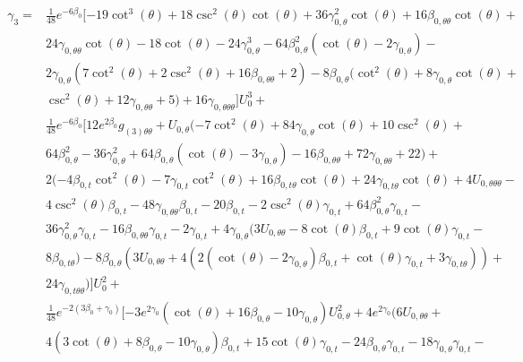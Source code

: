 \documentclass[a4paper,11pt]{article}
\numberwithin{equation}{section}
\begin{document}
\begin{align}
\begin{split} \label{eq: gamma_3_EM_tensor}
\gamma_{3}=&\frac{1}{48} e^{-6 \beta_{0}} [-19 \cot ^3(\theta )+18 \csc ^2(\theta ) \cot (\theta )+36 \gamma_{0, \theta}^2 \cot (\theta )+16 \beta_{0, \theta \theta} \cot (\theta )+\\
&24 \gamma_{0, \theta \theta} \cot (\theta )-18 \cot (\theta )-24 \gamma_{0, \theta}^3-64 \beta_{0, \theta}^2 (\cot (\theta )-2 \gamma_{0, \theta})-\\
&2 \gamma_{0, \theta} (7 \cot ^2(\theta )+2 \csc ^2(\theta )+16 \beta_{0, \theta \theta}+2)-8 \beta_{0, \theta} (\cot ^2(\theta )+8 \gamma_{0, \theta} \cot (\theta )+\\
&\csc ^2(\theta )+12 \gamma_{0, \theta \theta}+5)+16 \gamma_{0, \theta \theta \theta} ] U_{0}^3+\\
&\frac{1}{48} e^{-6 \beta_{0}} [12 e^{2 \beta_{0}} g_{(3) \theta \theta}+U_{0, \theta} (-7 \cot ^2(\theta )+84 \gamma_{0, \theta} \cot (\theta )+10 \csc ^2(\theta )+\\
&64 \beta_{0, \theta}^2-36 \gamma_{0, \theta}^2+64 \beta_{0, \theta} (\cot (\theta )-3 \gamma_{0, \theta})-16 \beta_{0, \theta \theta}+72 \gamma_{0, \theta \theta}+22)+\\
&2 (-4 \beta_{0, t}  \cot ^2(\theta )-7 \gamma_{0, t}  \cot ^2(\theta )+16 \beta_{0, t \theta}  \cot (\theta )+24 \gamma_{0, t \theta}  \cot (\theta )+4 U_{0, \theta \theta \theta} -\\
&4 \csc ^2(\theta ) \beta_{0, t} -48 \gamma_{0, \theta \theta} \beta_{0, t} -20 \beta_{0, t} -2 \csc ^2(\theta ) \gamma_{0, t} +64 \beta_{0, \theta}^2 \gamma_{0, t} -\\
&36 \gamma_{0, \theta}^2 \gamma_{0, t} -16 \beta_{0, \theta \theta} \gamma_{0, t} -2 \gamma_{0, t} +4 \gamma_{0, \theta} (3 U_{0, \theta \theta}-8 \cot (\theta ) \beta_{0, t} +9 \cot (\theta ) \gamma_{0, t} -\\
&8 \beta_{0, t \theta} )-8 \beta_{0, \theta} (3 U_{0, \theta \theta}+4 (2 (\cot (\theta )-2 \gamma_{0, \theta}) \beta_{0, t} +\cot (\theta ) \gamma_{0, t} +3 \gamma_{0, t \theta} ))+\\
&24 \gamma_{0, t \theta \theta})] U_{0}^2+\\
&\frac{1}{48} e^{-2 (3 \beta_{0}+\gamma_{0})} [-3 e^{2 \gamma_{0}} (\cot (\theta )+16 \beta_{0, \theta}-10 \gamma_{0, \theta}) U_{0, \theta}^2+4 e^{2 \gamma_{0}} (6 U_{0, \theta \theta}+\\
&4 (3 \cot (\theta )+8 \beta_{0, \theta}-10 \gamma_{0, \theta}) \beta_{0, t} +15 \cot (\theta ) \gamma_{0, t} -24 \beta_{0, \theta} \gamma_{0, t} -18 \gamma_{0, \theta} \gamma_{0, t} -\\

\end{split}
\end{align}
\end{document}
